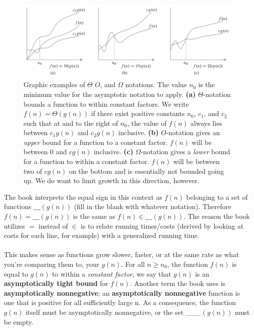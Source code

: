 \documentclass[12pt]{article}
\begin{document}
\begin{figure}[ht]
\centering
\includegraphics[scale=0.35]{asymptotic_notation}
\caption{
Graphic examples of $\Theta$ $O$, and $\Omega$ notations. The value $n_0$ is the minimum value for the asymptotic notation to apply.
\textbf{(a)} $\Theta$-notation bounds a function to within constant factors. We write $f(n)=\Theta{(g(n))}$ if there exist positive constants $n_0$, $c_1$, and $c_2$ such that at and to the right of $n_0$, the value of $f(n)$ always lies between $c_1g(n)$ and $c_2g(n)$ inclusive.
\textbf{(b)} $O$-notation gives an \textit{upper} bound for a function to a constant factor. $f(n)$ will be between 0 and $cg(n)$ inclusive.
\textbf{(c)} $\Omega$-notation gives a \textit{lower} bound for a function to within a constant factor. $f(n)$ will be between two of $cg(n)$ on the bottom and is essentially not bounded going up. We do want to limit growth in this direction, however.
}
\label{fig:asymptotic_notation}
\end{figure}
\newpage
The book interprets the equal sign in this context as $f(n)$ belonging to a set of functions $\_\_\_(g(n))$ (fill in the blank with whatever notation). Therefore $f(n)=\_\_\_(g(n))$ is the same as $f(n) \in \_\_\_(g(n))$. The reason the book utilizes $=$ instead of $\in$ is to relate running times/costs (derived by looking at costs for each line, for example) with a generalized running time.
\\ \\
This makes sense as functions grow slower, faster, or at the same rate as what you're comparing them to, your $g(n)$. For all $n \geq n_0$, the function $f(n)$ is equal to $g(n)$ to within a \textit{constant factor}, we say that $g(n)$ is an \textbf{asymptotically tight bound} for $f(n)$. Another term the book uses is \textbf{asymptotically nonnegative}; an \textbf{asymptotically nonnegative} function is one that is positive for all sufficiently large n. As a consequence, the function $g(n)$ itself must be asymptotically nonnegative, or the set \_\_\_$(g(n))$ must be empty. 
\end{document}
